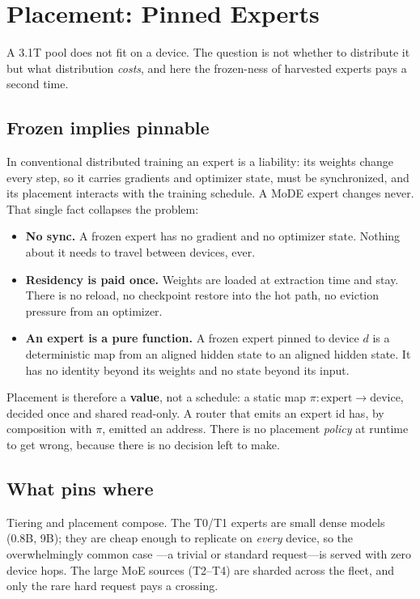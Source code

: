 \documentclass[11pt,a4paper]{article}
\begin{document}
\section{Placement: Pinned Experts}

A 3.1T pool does not fit on a device. The question is not whether to distribute it but
what distribution \emph{costs}, and here the frozen-ness of harvested experts pays a
second time.

\subsection{Frozen implies pinnable}

In conventional distributed training an expert is a liability: its weights change every
step, so it carries gradients and optimizer state, must be synchronized, and its
placement interacts with the training schedule. A MoDE expert changes never. That single
fact collapses the problem:

\begin{itemize}
  \item \textbf{No sync.} A frozen expert has no gradient and no optimizer state. Nothing
        about it needs to travel between devices, ever.
  \item \textbf{Residency is paid once.} Weights are loaded at extraction time and stay.
        There is no reload, no checkpoint restore into the hot path, no eviction pressure
        from an optimizer.
  \item \textbf{An expert is a pure function.} A frozen expert pinned to device $d$ is a
        deterministic map from an aligned hidden state to an aligned hidden state. It has
        no identity beyond its weights and no state beyond its input.
\end{itemize}

Placement is therefore a \textbf{value}, not a schedule: a static map
$\pi : \text{expert} \rightarrow \text{device}$, decided once and shared read-only. A
router that emits an expert id has, by composition with $\pi$, emitted an address. There
is no placement \emph{policy} at runtime to get wrong, because there is no decision left
to make.

\subsection{What pins where}

Tiering and placement compose. The T0/T1 experts are small dense models (0.8B, 9B); they
are cheap enough to replicate on \emph{every} device, so the overwhelmingly common case
---a trivial or standard request---is served with zero device hops. The large MoE sources
(T2--T4) are sharded across the fleet, and only the rare hard request pays a crossing.
\end{document}
